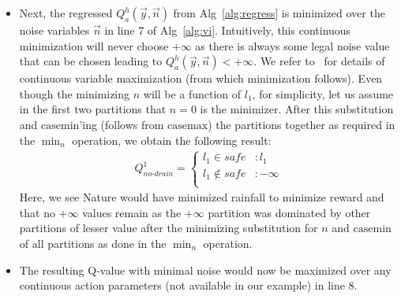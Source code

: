 \documentclass[letterpaper]{article}
\newcommand{\casemax}{\mathrm{casemax}}
\newcommand{\casemin}{\mathrm{casemin}}
\begin{document}
\begin{itemize}
\item Next, the regressed $Q_a^{h}(\vec{y},\vec{n})$ from
  Alg~\ref{alg:regress} is minimized over the noise variables
  $\vec{n}$ in line 7 of Alg~\ref{alg:vi}.  Intuitively, this
  continuous minimization will never choose $+\infty$ as there is
  always some legal noise value that can be chosen leading to
  $Q_a^{h}(\vec{y},\vec{n}) < +\infty$.  We refer to~\cite{sdp_aaai}
  for details of continuous variable maximization (from which
  minimization follows).  Even though the minimizing $n$ will be a
  function of $l_1$, for simplicity, let us assume in the first two
  partitions that $n=0$ is the minimizer.  After this substitution and
  $\casemin$'ing (follows from $\casemax$) the partitions together as
  required in the $\min_n$ operation, we obtain the following result:
\begin{align}
Q^1_{\mathit{no}\text{-}\mathit{drain}} =  
\begin{cases}
l_1 \in \mathit{safe}     &: l_1\\
l_1  \notin \mathit{safe} &: -\infty\\
\end{cases} \label{eq:finalq}
\end{align}
Here, we see Nature would have minimized rainfall to minimize reward
and that no $+\infty$ values remain as the $+\infty$ partition was
dominated by other partitions of lesser value after the minimizing
substitution for $n$ and $\casemin$ of all partitions as done in the
$\min_n$ operation.

\item The resulting Q-value with minimal noise would now be maximized over any continuous action parameters (not available in our example) in line 8.  


\end{itemize}
\end{document}
